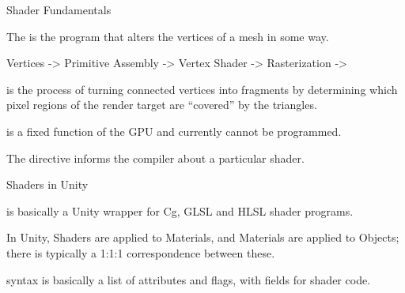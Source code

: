 \documentclass[11pt]{article}
\begin{document}
\maketitle

\begin{topic}{Shader Fundamentals}
	\item The  is the program that alters the vertices of a mesh in some way.
	\item Vertices -> Primitive Assembly -> Vertex Shader -> Rasterization -> 
	\item {} is the process of turning connected vertices into fragments by determining which pixel regions of the render target are ``covered'' by the triangles.
	\item {} is a fixed function of the GPU and currently cannot be programmed.
	\item The  directive informs the compiler about a particular shader.
\end{topic}

\begin{topic}{Shaders in Unity}
	\item {} is basically a Unity wrapper for Cg, GLSL and HLSL shader programs.
	\item In Unity, Shaders are applied to Materials, and Materials are applied to Objects; there is typically a 1:1:1 correspondence between these.
	\item {} syntax is basically a list of attributes and flags, with fields for shader code.
\end{topic}
\end{document}
